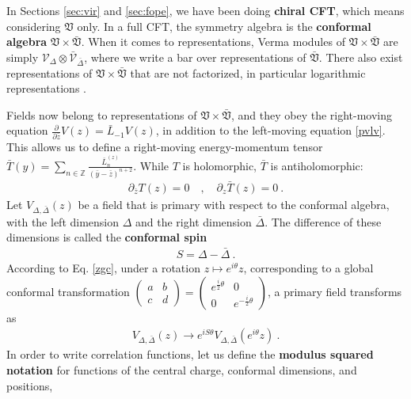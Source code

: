 \documentclass[12pt, a4paper]{article}
\newcommand{\myindex}[1]{\textbf{\boldmath #1}}
\begin{document}
In Sections \ref{sec:vir} and \ref{sec:fope}, we have been doing \myindex{chiral CFT}, which means considering $\mathfrak{V}$ only. In a full CFT, the symmetry algebra is the \myindex{conformal algebra} $\mathfrak{V}\times \bar{\mathfrak{V}}$. When it comes to representations, Verma modules of $\mathfrak{V}\times \bar{\mathfrak{V}}$ are simply $\mathcal{V}_\Delta\otimes \bar{\mathcal{V}}_{\bar \Delta}$, where we write a bar over representations of $\bar{\mathfrak{V}}$. There also exist representations of $\mathfrak{V}\times \bar{\mathfrak{V}}$ that are not factorized, in particular logarithmic representations \cite{nr20}.

Fields now belong to representations of $\mathfrak{V}\times \bar{\mathfrak{V}}$, and they obey the right-moving equation $\frac{\partial}{\partial \bar z} V(z) = \bar L_{-1} V(z)$, in addition to the left-moving equation \eqref{pvlv}. This allows us to define a right-moving energy-momentum tensor $\bar T(y) = \sum_{n\in\mathbb{Z}} \frac{\bar L_n^{(z)}}{(\bar y-\bar z)^{n+2}}$. While $T$ is holomorphic, $\bar T$ is antiholomorphic:
\begin{align}
 \partial_{\bar z} T(z) = 0 \quad , \quad \partial_z \bar T(z) = 0 \ . 
\end{align}
Let $V_{\Delta,\bar\Delta}(z)$ be a field that is primary with respect to the conformal algebra, with the left dimension $\Delta$ and the right dimension $\bar\Delta$. The difference of these dimensions is called the \myindex{conformal spin}
\begin{align}
 S = \Delta -\bar\Delta\ . 
 \label{sdd} 
\end{align}
According to Eq. \eqref{zgc}, 
under a rotation $z\mapsto e^{i\theta}z$, corresponding to a global conformal transformation $\left(\begin{smallmatrix} a & b \\ c & d\end{smallmatrix}\right)= \left(\begin{smallmatrix} e^{\frac{i}{2}\theta} & 0 \\ 0 &  e^{-\frac{i}{2}\theta}\end{smallmatrix}\right)$, a primary field transforms as 
\begin{align}
 V_{\Delta,\bar\Delta}(z) \to  e^{iS\theta} V_{\Delta,\bar\Delta}\left(e^{i\theta} z\right) \ .
 \label{veis}
\end{align}
In order to write correlation functions, let us define the \myindex{modulus squared notation} for functions of the central charge, conformal dimensions, and positions,
\end{document}
